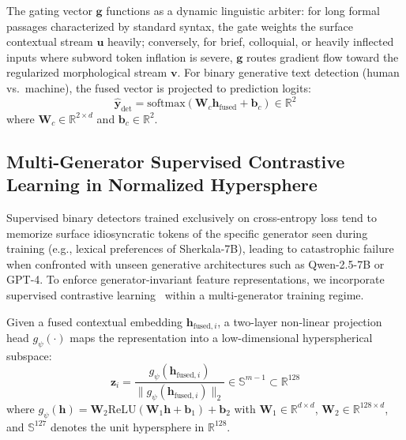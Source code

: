 The gating vector $\mathbf{g}$ functions as a dynamic linguistic arbiter: for long formal passages characterized by standard syntax, the gate weights the surface contextual stream $\mathbf{u}$ heavily; conversely, for brief, colloquial, or heavily inflected inputs where subword token inflation is severe, $\mathbf{g}$ routes gradient flow toward the regularized morphological stream $\mathbf{v}$. For binary generative text detection (human vs.\ machine), the fused vector is projected to prediction logits:
\begin{equation}
\label{eq:detection_head}
\hat{\mathbf{y}}_{\text{det}} = \mathrm{softmax}\left(\mathbf{W}_c \mathbf{h}_{\text{fused}} + \mathbf{b}_c\right) \in \mathbb{R}^2
\end{equation}
where $\mathbf{W}_c \in \mathbb{R}^{2 \times d}$ and $\mathbf{b}_c \in \mathbb{R}^2$.

\subsection{Multi-Generator Supervised Contrastive Learning in Normalized Hypersphere}
\label{sec:contrastive_learning}
Supervised binary detectors trained exclusively on cross-entropy loss tend to memorize surface idiosyncratic tokens of the specific generator seen during training (e.g., lexical preferences of Sherkala-7B), leading to catastrophic failure when confronted with unseen generative architectures such as Qwen-2.5-7B or GPT-4. To enforce generator-invariant feature representations, we incorporate supervised contrastive learning~\citep{khosla2020supervised} within a multi-generator training regime.

Given a fused contextual embedding $\mathbf{h}_{\text{fused}, i}$, a two-layer non-linear projection head $g_\psi(\cdot)$ maps the representation into a low-dimensional hyperspherical subspace:
\begin{equation}
\label{eq:projection_head}
\mathbf{z}_i = \frac{g_\psi(\mathbf{h}_{\text{fused}, i})}{\|g_\psi(\mathbf{h}_{\text{fused}, i})\|_2} \in \mathbb{S}^{m-1} \subset \mathbb{R}^{128}
\end{equation}
where $g_\psi(\mathbf{h}) = \mathbf{W}_2 \mathrm{ReLU}(\mathbf{W}_1 \mathbf{h} + \mathbf{b}_1) + \mathbf{b}_2$ with $\mathbf{W}_1 \in \mathbb{R}^{d \times d}$, $\mathbf{W}_2 \in \mathbb{R}^{128 \times d}$, and $\mathbb{S}^{127}$ denotes the unit hypersphere in $\mathbb{R}^{128}$.

